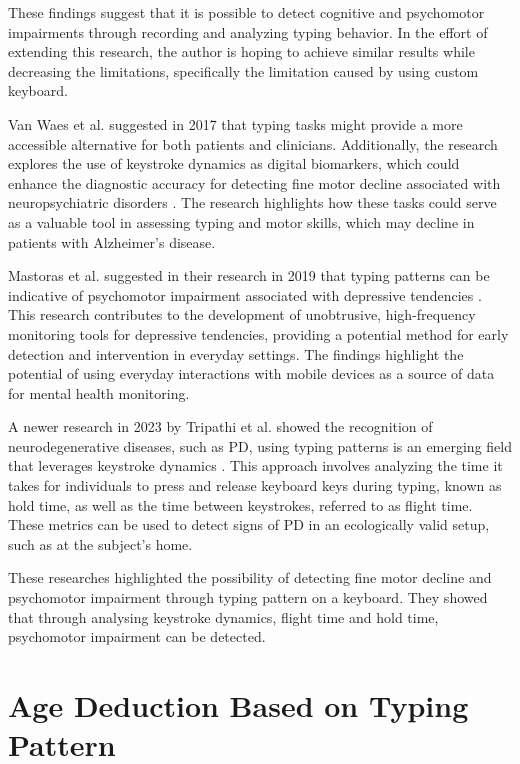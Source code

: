 These findings suggest that it is possible to detect cognitive and psychomotor impairments through recording and analyzing typing behavior.
In the effort of extending this research, the author is hoping to achieve similar results while decreasing the limitations, specifically the limitation caused by using custom keyboard.

Van Waes et al. suggested in 2017 that typing tasks might provide a more accessible alternative for both patients and clinicians. 
Additionally, the research explores the use of keystroke dynamics as digital biomarkers, which could enhance the diagnostic accuracy for detecting fine motor decline associated with neuropsychiatric disorders \cite{VanWaes2017}. 
The research highlights how these tasks could serve as a valuable tool in assessing typing and motor skills, which may decline in patients with Alzheimer's disease.

Mastoras et al. suggested in their research in 2019  that typing patterns can be indicative of psychomotor impairment associated with depressive tendencies \cite{Mastoras2019}. 
This research contributes to the development of unobtrusive, high-frequency monitoring tools for depressive tendencies, providing a potential method for early detection and intervention in everyday settings. 
The findings highlight the potential of using everyday interactions with mobile devices as a source of data for mental health monitoring.

A newer research in 2023 by Tripathi et al. showed the recognition of neurodegenerative diseases, such as \ac{PD}, using typing patterns is an emerging field that leverages keystroke dynamics \cite{Tripathi2023}. 
This approach involves analyzing the time it takes for individuals to press and release keyboard keys during typing, known as hold time, as well as the time between keystrokes, referred to as flight time. 
These metrics can be used to detect signs of \ac{PD} in an ecologically valid setup, such as at the subject's home.

These researches highlighted the possibility of detecting fine motor decline and psychomotor impairment through typing pattern on a keyboard. 
They showed that through analysing keystroke dynamics, flight time and hold time, psychomotor impairment can be detected. 

\section{Age Deduction Based on Typing Pattern}

